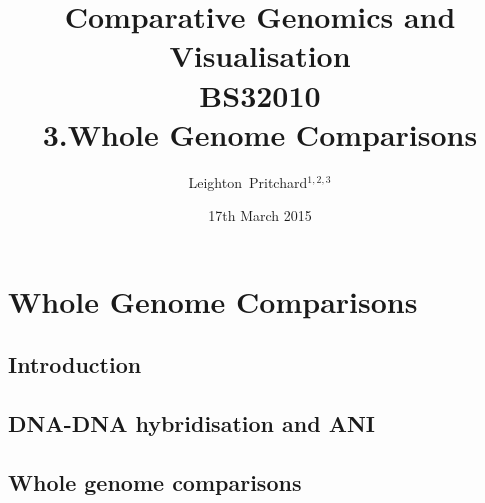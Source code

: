 

%



\title[Comparative Genomics and Visualisation: 3.Whole Genomes] %
{Comparative Genomics and \\ Visualisation \\
BS32010 \\
3.Whole Genome Comparisons}
\author[Pritchard] %
{Leighton~Pritchard$^{1,2,3}$}
\date[17th March 2015] %
{17th March 2015}
\subject{Bioinformatics, Genomics, Bacteria, Sequencing, Microbiology, Microbes, Comparative Genomics, Visualisation}





\frame[plain]{\titlepage}



\section{Whole Genome Comparisons}
\subsection{Introduction}

\subsection{DNA-DNA hybridisation and ANI}


\subsection{Whole genome comparisons}






